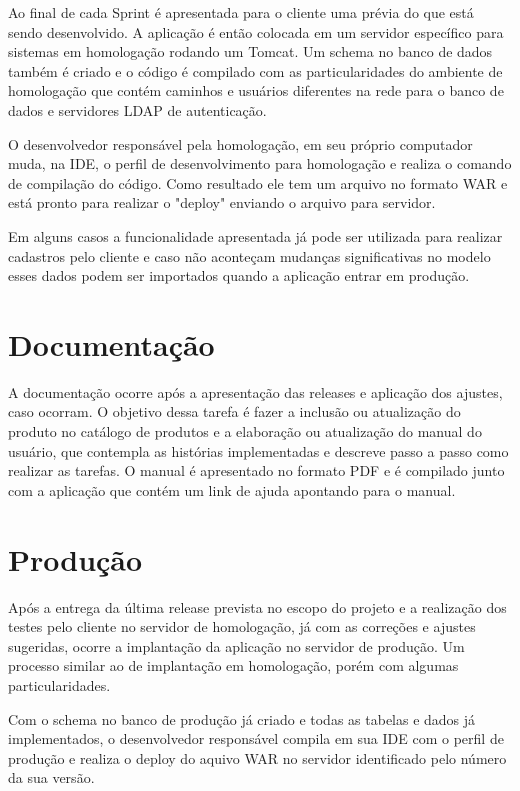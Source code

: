 Ao final de cada Sprint é apresentada para o cliente uma prévia do que está sendo desenvolvido. A aplicação é então colocada em um servidor específico para sistemas em homologação rodando um Tomcat. Um schema no banco de dados também é criado e o código é compilado com as particularidades do ambiente de homologação que contém caminhos e usuários diferentes na rede para o banco de dados e servidores LDAP de autenticação. 

O desenvolvedor responsável pela homologação, em seu próprio computador muda, na IDE, o perfil de desenvolvimento para homologação e realiza o comando de compilação do código. Como resultado ele tem um arquivo no formato WAR e está pronto para realizar o "deploy" enviando o arquivo para servidor.

Em alguns casos a funcionalidade apresentada já pode ser utilizada para realizar cadastros pelo cliente e caso não aconteçam mudanças significativas no modelo esses dados podem ser importados quando a aplicação entrar em produção. 



\section{Documentação}
\label{sec:atividadesRealizadasDocumentacao}

A documentação ocorre após a apresentação das releases e aplicação dos ajustes, caso ocorram. O objetivo dessa tarefa é fazer a inclusão ou atualização do produto no catálogo de  produtos e a elaboração ou atualização do manual do usuário, que contempla as histórias implementadas e descreve passo a passo como realizar as tarefas. O manual é apresentado no formato PDF e é compilado junto com a aplicação que contém um link de ajuda apontando para o manual.


\section{Produção}
\label{sec:atividadesRealizadasProdução}

Após a entrega da última release prevista no escopo do projeto e a realização dos testes pelo cliente no servidor de homologação, já com as correções e ajustes sugeridas, ocorre a implantação da aplicação no servidor de produção. Um processo similar ao de implantação em homologação, porém com algumas particularidades.

Com o schema no banco de produção já criado e todas as tabelas e dados já implementados, o desenvolvedor responsável compila em sua IDE com o perfil de produção e realiza o deploy do aquivo WAR no servidor identificado pelo número da sua versão.

